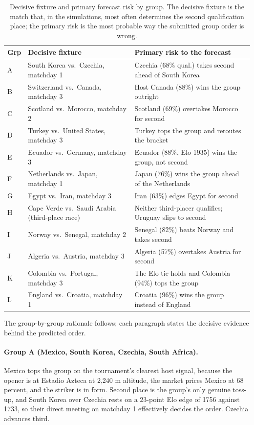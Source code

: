 \documentclass[11pt,letterpaper]{article}
\begin{document}
\begin{table}[ht]
\centering\small
\caption{Decisive fixture and primary forecast risk by group. The decisive fixture is the match that, in the simulations, most often determines the second qualification place; the primary risk is the most probable way the submitted group order is wrong.}
\label{tab:watchrisk}
\begin{tabular}{p{0.5cm}p{5.4cm}p{6.6cm}}
\toprule
Grp & Decisive fixture & Primary risk to the forecast \\
\midrule
A & South Korea vs.\ Czechia, matchday 1 & Czechia (68\% qual.) takes second ahead of South Korea \\
B & Switzerland vs.\ Canada, matchday 3 & Host Canada (88\%) wins the group outright \\
C & Scotland vs.\ Morocco, matchday 2 & Scotland (69\%) overtakes Morocco for second \\
D & Turkey vs.\ United States, matchday 3 & Turkey tops the group and reroutes the bracket \\
E & Ecuador vs.\ Germany, matchday 3 & Ecuador (88\%, Elo 1935) wins the group, not second \\
F & Netherlands vs.\ Japan, matchday 1 & Japan (76\%) wins the group ahead of the Netherlands \\
G & Egypt vs.\ Iran, matchday 3 & Iran (63\%) edges Egypt for second \\
H & Cape Verde vs.\ Saudi Arabia (third-place race) & Neither third-placer qualifies; Uruguay slips to second \\
I & Norway vs.\ Senegal, matchday 2 & Senegal (82\%) beats Norway and takes second \\
J & Algeria vs.\ Austria, matchday 3 & Algeria (57\%) overtakes Austria for second \\
K & Colombia vs.\ Portugal, matchday 3 & The Elo tie holds and Colombia (94\%) tops the group \\
L & England vs.\ Croatia, matchday 1 & Croatia (96\%) wins the group instead of England \\
\bottomrule
\end{tabular}
\end{table}

The group-by-group rationale follows; each paragraph states the decisive evidence behind the predicted order.

\paragraph{Group A (Mexico, South Korea, Czechia, South Africa).} Mexico tops the group on the tournament's clearest host signal, because the opener is at Estadio Azteca at 2{,}240 m altitude, the market prices Mexico at 68 percent, and the striker is in form. Second place is the group's only genuine toss-up, and South Korea over Czechia rests on a 23-point Elo edge of 1756 against 1733, so their direct meeting on matchday 1 effectively decides the order. Czechia advances third.
\end{document}
